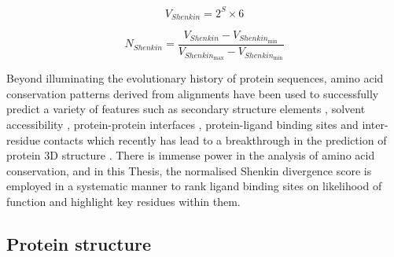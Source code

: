 \vspace{-13pt} %
\vspace{-13pt} %

\begin{equation}
V_{Shenkin} = 2^S \times 6
\label{eq:shenkin}
\end{equation}

\vspace{-13pt} %
\vspace{-6pt} %

\begin{equation}
N_{Shenkin} = \frac{V_{Shenkin} - V_{Shenkin_{\text{min}}}}{V_{Shenkin_{\text{max}}} - V_{Shenkin_{\text{min}}}}
\label{eq:shenkin_norm}
\end{equation}

Beyond illuminating the evolutionary history of protein sequences, amino acid conservation patterns derived from alignments have been used to successfully predict a variety of features such as secondary structure elements \cite{ROST_1993_SSPRED}, solvent accessibility \cite{ROST_1994_RSAPRED}, protein-protein interfaces \cite{LICHTARGE_1996_PPIs}, protein-ligand binding sites \cite{GLASER_2006_PREDICTION} and inter-residue contacts \cite{MARKS_2011_CONS} which recently has lead to a breakthrough in the prediction of protein 3D structure \cite{JUMPER_2021_ALPHAFOLD}. There is immense power in the analysis of amino acid conservation, and in this Thesis, the normalised Shenkin divergence score is employed in a systematic manner to rank ligand binding sites on likelihood of function and highlight key residues within them. 

\subsection{Protein structure}


